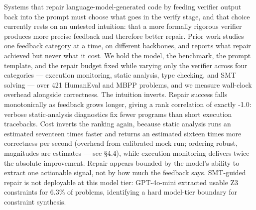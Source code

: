 
Systems that repair language-model-generated code by feeding verifier output back into the prompt must choose what goes in the verify stage, and that choice currently rests on an untested intuition: that a more formally rigorous verifier produces more precise feedback and therefore better repair. Prior work studies one feedback category at a time, on different backbones, and reports what repair achieved but never what it cost. We hold the model, the benchmark, the prompt template, and the repair budget fixed while varying only the verifier across four categories --- execution monitoring, static analysis, type checking, and SMT solving --- over 421 HumanEval and MBPP problems, and we measure wall-clock overhead alongside correctness. The intuition inverts. Repair success falls monotonically as feedback grows longer, giving a rank correlation of exactly -1.0: verbose static-analysis diagnostics fix fewer programs than short execution tracebacks. Cost inverts the ranking again, because static analysis runs an estimated seventeen times faster and returns an estimated sixteen times more correctness per second (overhead from calibrated mock run; ordering robust, magnitudes are estimates --- see §4.4), while execution monitoring delivers twice the absolute improvement. Repair appears bounded by the model's ability to extract one actionable signal, not by how much the feedback says. SMT-guided repair is not deployable at this model tier: GPT-4o-mini extracted usable Z3 constraints for 6.3\% of problems, identifying a hard model-tier boundary for constraint synthesis.

